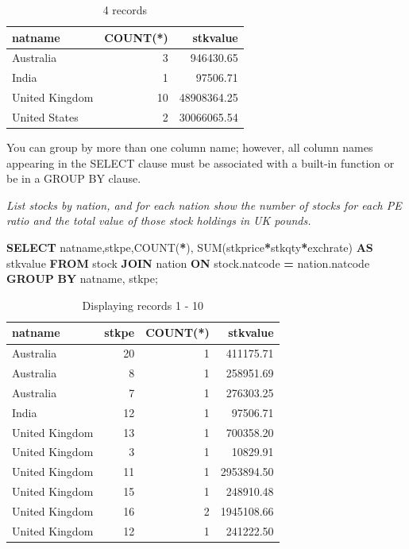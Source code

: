\documentclass[
]{article}
\newenvironment{Shaded}{\begin{snugshade}}{\end{snugshade}}
\newcommand{\FunctionTok}[1]{\textcolor[rgb]{0.00,0.00,0.00}{#1}}
\newcommand{\KeywordTok}[1]{\textcolor[rgb]{0.13,0.29,0.53}{\textbf{#1}}}
\newcommand{\NormalTok}[1]{#1}
\newcommand{\OperatorTok}[1]{\textcolor[rgb]{0.81,0.36,0.00}{\textbf{#1}}}
\begin{document}
\begin{table}

\caption{\label{tab:unnamed-chunk-44}4 records}
\centering
\begin{tabular}[t]{l|r|r}
\hline
natname & COUNT(*) & stkvalue\\
\hline
Australia & 3 & 946430.65\\
\hline
India & 1 & 97506.71\\
\hline
United Kingdom & 10 & 48908364.25\\
\hline
United States & 2 & 30066065.54\\
\hline
\end{tabular}
\end{table}

You can group by more than one column name; however, all column names
appearing in the SELECT clause must be associated with a built-in
function or be in a GROUP BY clause.

\emph{List stocks by nation, and for each nation show the number of stocks
for each PE ratio and the total value of those stock holdings in UK
pounds.}

\begin{Shaded}
\begin{Highlighting}[]
\KeywordTok{SELECT}\NormalTok{ natname,stkpe,}\FunctionTok{COUNT}\NormalTok{(}\OperatorTok{*}\NormalTok{),}
    \FunctionTok{SUM}\NormalTok{(stkprice}\OperatorTok{*}\NormalTok{stkqty}\OperatorTok{*}\NormalTok{exchrate) }\KeywordTok{AS}\NormalTok{ stkvalue}
        \KeywordTok{FROM}\NormalTok{ stock }\KeywordTok{JOIN}\NormalTok{ nation }\KeywordTok{ON}\NormalTok{ stock.natcode }\OperatorTok{=}\NormalTok{ nation.natcode}
            \KeywordTok{GROUP} \KeywordTok{BY}\NormalTok{ natname, stkpe;}
\end{Highlighting}
\end{Shaded}

\begin{table}

\caption{\label{tab:unnamed-chunk-45}Displaying records 1 - 10}
\centering
\begin{tabular}[t]{l|r|r|r}
\hline
natname & stkpe & COUNT(*) & stkvalue\\
\hline
Australia & 20 & 1 & 411175.71\\
\hline
Australia & 8 & 1 & 258951.69\\
\hline
Australia & 7 & 1 & 276303.25\\
\hline
India & 12 & 1 & 97506.71\\
\hline
United Kingdom & 13 & 1 & 700358.20\\
\hline
United Kingdom & 3 & 1 & 10829.91\\
\hline
United Kingdom & 11 & 1 & 2953894.50\\
\hline
United Kingdom & 15 & 1 & 248910.48\\
\hline
United Kingdom & 16 & 2 & 1945108.66\\
\hline
United Kingdom & 12 & 1 & 241222.50\\
\hline
\end{tabular}
\end{table}
\end{document}
